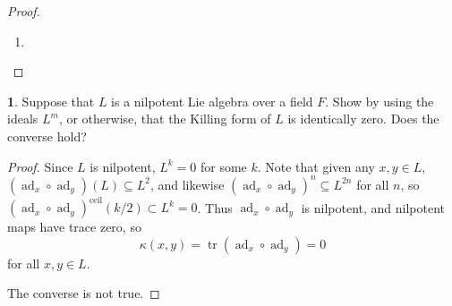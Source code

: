 \documentclass[12pt]{article}
\DeclareMathOperator{\ad}{ad}
\DeclareMathOperator{\tr}{tr}
\theoremstyle{definition}
\newtheorem{ex}{}
\begin{document}
\begin{proof}
\begin{enumerate}[label=(\roman*)]
\begin{align*}
        \kappa(f, h) & = \tr(\ad_f\circ\ad_h) = \tr\begin{pmatrix}0 & 0 & 0 \\ 0 & 0 & 0 \\ -2 & 0 & 0\end{pmatrix} = 0\\
        \kappa(e, e) & = \tr(\ad_e\circ\ad_e) = \tr\begin{pmatrix}0 & -2 & 0 \\ 0 & 0 & 0 \\ 0 & 0 & 0\end{pmatrix} = 0\\
        \kappa(f, f) & = \tr(\ad_f\circ\ad_f) = \tr\begin{pmatrix}0 & 0 & 0 \\ -2 & 0 & 0 \\ 0 & 0 & 0\end{pmatrix} = 0\\
        \kappa(h, h) & = \tr(\ad_h\circ\ad_h) = \tr\begin{pmatrix}4 & 0 & 0 \\ 0 & 4 & 0 \\ 0 & 0 & 0\end{pmatrix} = 8
      \end{align*}
		\item
	\end{enumerate}
\end{proof}

\begin{ex}
	Suppose that $L$ is a nilpotent Lie algebra over a field $F$.
	Show by using the ideals $L^m$, or otherwise, that the Killing form of $L$ is identically zero.
	Does the converse hold?
\end{ex}
\begin{proof}
  Since $L$ is nilpotent, $L^k = 0$ for some $k$.
  Note that given any $x, y \in L$,  $(\ad_x\circ\ad_y)(L) \subseteq L^{2}$, and likewise $(\ad_x\circ\ad_y)^n \subseteq L^{2n}$ for all $n$, so $(\ad_x\circ\ad_y)^\mathrm{ceil}(k/2) \subset L^k = 0$.
  Thus $\ad_x\circ\ad_y$ is nilpotent, and nilpotent maps have trace zero, so \begin{equation*}
    \kappa(x, y) = \tr(\ad_x\circ\ad_y) = 0
  \end{equation*}
  for all $x, y \in L$.

  The converse is not true.
\end{proof}
\end{document}
